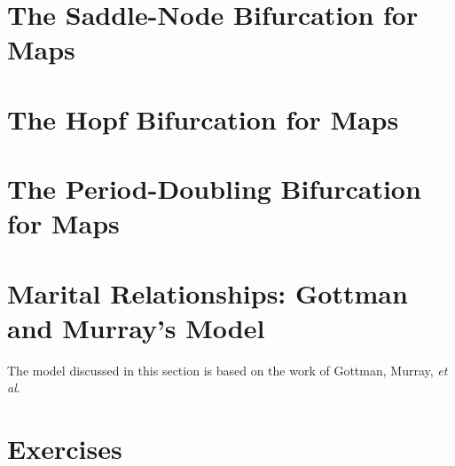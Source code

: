 \newpage

\section{The Saddle-Node Bifurcation for Maps}

\section{The Hopf Bifurcation for Maps}

\section{The Period-Doubling Bifurcation for Maps}

\section{Marital Relationships: Gottman and Murray's Model}
The model discussed in this section is based on the
work of Gottman, Murray, \emph{et al}\cite{GM}.
\section{Exercises}
%
%